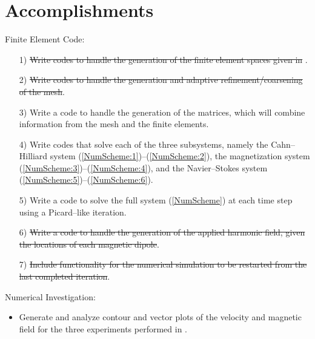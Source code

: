 \documentclass[9pt]{beamer}
\begin{document}
\section{Accomplishments}
\begin{frame}
Finite Element Code:
\begin{itemize}
	\item[1)] \st{Write codes to handle the generation of the finite element spaces given in }\cite{DiffuseInterface}. 
	
	\item[2)] \st{Write codes to handle the generation and adaptive refinement/coarsening of the mesh}.
	
	\item[3)] Write a code to handle the generation of the matrices, which will combine information from the mesh and the finite elements. 
	
	\item[4)] Write codes that solve each of the three subsystems, namely the Cahn--Hilliard system (\ref{NumScheme:1})--(\ref{NumScheme:2}), the magnetization system (\ref{NumScheme:3})--(\ref{NumScheme:4}), and the Navier--Stokes system (\ref{NumScheme:5})--(\ref{NumScheme:6}).
	
	\item[5)] Write a code to solve the full system (\ref{NumScheme}) at each time step using a Picard--like iteration.
	
	\item[6)] \st{Write a code to handle the generation of the applied harmonic field, given the locations of each magnetic dipole}.
	
	\item[7)] \st{Include functionality for the numerical simulation to be restarted from the last completed iteration}.
\end{itemize}
Numerical Investigation:
\begin{itemize}
	\item Generate and analyze contour and vector plots of the velocity and magnetic field for the three experiments performed in \cite{DiffuseInterface}.
\end{itemize}
\end{frame}
\end{document}
